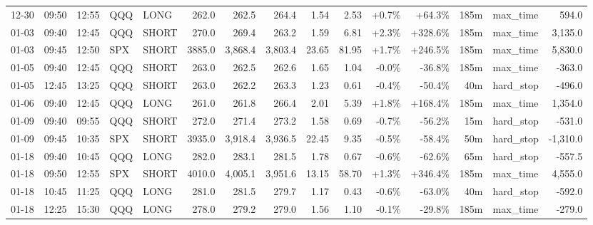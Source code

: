 \documentclass[11pt,a4paper,twoside]{article}
\begin{document}
\begin{landscape}
\begin{center}
\begin{longtable}{>{\color{txtmain}}l l l l l r r r r r r r r >{\color{txtmain}}l r}
12-30 & 09:50 & 12:55 & QQQ & LONG & 262.0 & 262.5 & 264.4 & 1.54 & 2.53 & \textcolor{wingreen}{+0.7\%} & \textcolor{wingreen}{+64.3\%} & 185m & max\_time & \textcolor{wingreen}{594.0} \\
01-03 & 09:40 & 12:45 & QQQ & SHORT & 270.0 & 269.4 & 263.2 & 1.59 & 6.81 & \textcolor{wingreen}{+2.3\%} & \textcolor{wingreen}{+328.6\%} & 185m & max\_time & \textcolor{wingreen}{3,135.0} \\
01-03 & 09:45 & 12:50 & SPX & SHORT & 3885.0 & 3,868.4 & 3,803.4 & 23.65 & 81.95 & \textcolor{wingreen}{+1.7\%} & \textcolor{wingreen}{+246.5\%} & 185m & max\_time & \textcolor{wingreen}{5,830.0} \\
01-05 & 09:40 & 12:45 & QQQ & SHORT & 263.0 & 262.5 & 262.6 & 1.65 & 1.04 & \textcolor{lossred}{-0.0\%} & \textcolor{lossred}{-36.8\%} & 185m & max\_time & \textcolor{lossred}{-363.0} \\
01-05 & 12:45 & 13:25 & QQQ & SHORT & 263.0 & 262.2 & 263.3 & 1.23 & 0.61 & \textcolor{lossred}{-0.4\%} & \textcolor{lossred}{-50.4\%} & 40m & hard\_stop & \textcolor{lossred}{-496.0} \\
01-06 & 09:40 & 12:45 & QQQ & LONG & 261.0 & 261.8 & 266.4 & 2.01 & 5.39 & \textcolor{wingreen}{+1.8\%} & \textcolor{wingreen}{+168.4\%} & 185m & max\_time & \textcolor{wingreen}{1,354.0} \\
01-09 & 09:40 & 09:55 & QQQ & SHORT & 272.0 & 271.4 & 273.2 & 1.58 & 0.69 & \textcolor{lossred}{-0.7\%} & \textcolor{lossred}{-56.2\%} & 15m & hard\_stop & \textcolor{lossred}{-531.0} \\
01-09 & 09:45 & 10:35 & SPX & SHORT & 3935.0 & 3,918.4 & 3,936.5 & 22.45 & 9.35 & \textcolor{lossred}{-0.5\%} & \textcolor{lossred}{-58.4\%} & 50m & hard\_stop & \textcolor{lossred}{-1,310.0} \\
01-18 & 09:40 & 10:45 & QQQ & LONG & 282.0 & 283.1 & 281.5 & 1.78 & 0.67 & \textcolor{lossred}{-0.6\%} & \textcolor{lossred}{-62.6\%} & 65m & hard\_stop & \textcolor{lossred}{-557.5} \\
01-18 & 09:50 & 12:55 & SPX & SHORT & 4010.0 & 4,005.1 & 3,951.6 & 13.15 & 58.70 & \textcolor{wingreen}{+1.3\%} & \textcolor{wingreen}{+346.4\%} & 185m & max\_time & \textcolor{wingreen}{4,555.0} \\
01-18 & 10:45 & 11:25 & QQQ & LONG & 281.0 & 281.5 & 279.7 & 1.17 & 0.43 & \textcolor{lossred}{-0.6\%} & \textcolor{lossred}{-63.0\%} & 40m & hard\_stop & \textcolor{lossred}{-592.0} \\
01-18 & 12:25 & 15:30 & QQQ & LONG & 278.0 & 279.2 & 279.0 & 1.56 & 1.10 & \textcolor{lossred}{-0.1\%} & \textcolor{lossred}{-29.8\%} & 185m & max\_time & \textcolor{lossred}{-279.0} \\

\end{longtable}
\end{center}
\end{landscape}
\end{document}
